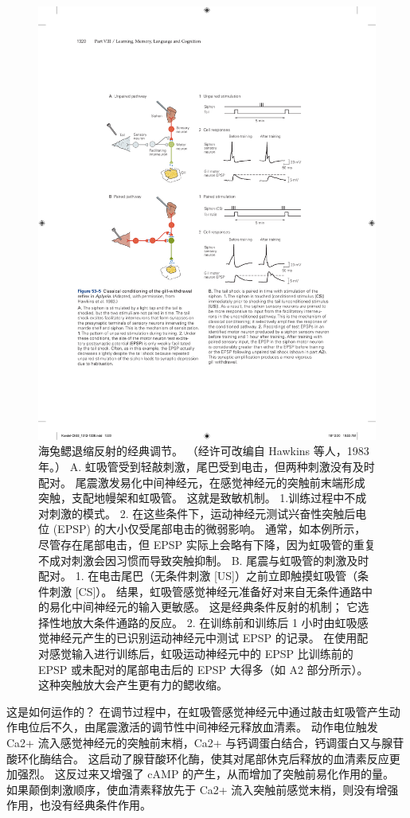 \begin{figure}[htbp]
	\centering
	\includegraphics[width=0.75\linewidth]{chap53/fig_53_5}
	\caption{海兔鳃退缩反射的经典调节。 （经许可改编自 Hawkins 等人，1983 年。） A. 虹吸管受到轻敲刺激，尾巴受到电击，但两种刺激没有及时配对。 尾震激发易化中间神经元，在感觉神经元的突触前末端形成突触，支配地幔架和虹吸管。 这就是致敏机制。 1.训练过程中不成对刺激的模式。 2. 在这些条件下，运动神经元测试兴奋性突触后电位 (EPSP) 的大小仅受尾部电击的微弱影响。 通常，如本例所示，尽管存在尾部电击，但 EPSP 实际上会略有下降，因为虹吸管的重复不成对刺激会因习惯而导致突触抑制。 B. 尾震与虹吸管的刺激及时配对。 1. 在电击尾巴（无条件刺激 [US]）之前立即触摸虹吸管（条件刺激 [CS]）。 结果，虹吸管感觉神经元准备好对来自无条件通路中的易化中间神经元的输入更敏感。 这是经典条件反射的机制； 它选择性地放大条件通路的反应。 2. 在训练前和训练后 1 小时由虹吸感觉神经元产生的已识别运动神经元中测试 EPSP 的记录。 在使用配对感觉输入进行训练后，虹吸运动神经元中的 EPSP 比训练前的 EPSP 或未配对的尾部电击后的 EPSP 大得多（如 A2 部分所示）。 这种突触放大会产生更有力的鳃收缩。}
	\label{fig:53_5}
\end{figure}


这是如何运作的？
在调节过程中，在虹吸管感觉神经元中通过敲击虹吸管产生动作电位后不久，由尾震激活的调节性中间神经元释放血清素。
动作电位触发 Ca2+ 流入感觉神经元的突触前末梢，Ca2+ 与钙调蛋白结合，钙调蛋白又与腺苷酸环化酶结合。
这启动了腺苷酸环化酶，使其对尾部休克后释放的血清素反应更加强烈。
这反过来又增强了 cAMP 的产生，从而增加了突触前易化作用的量。
如果颠倒刺激顺序，使血清素释放先于 Ca2+ 流入突触前感觉末梢，则没有增强作用，也没有经典条件作用。


